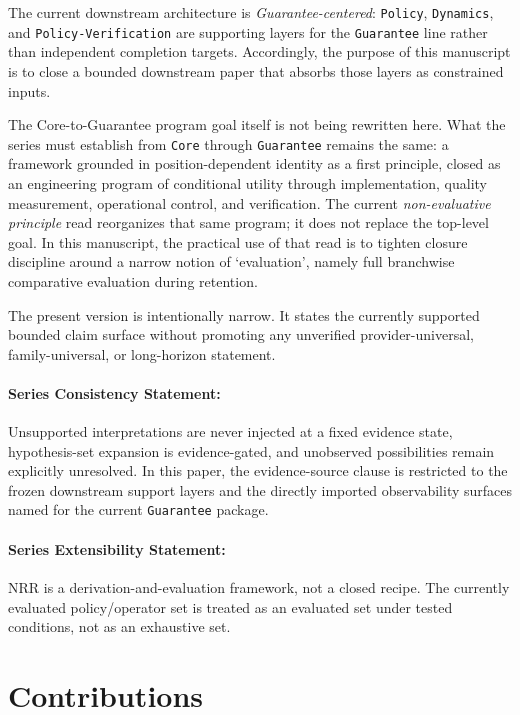 \documentclass[11pt]{article}
\begin{document}
The current downstream architecture is \textit{Guarantee-centered}: \texttt{Policy},
\texttt{Dynamics}, and \texttt{Policy-Verification} are supporting layers for the
\texttt{Guarantee} line rather than independent completion targets. Accordingly, the
purpose of this manuscript is to close a bounded downstream paper that absorbs those
layers as constrained inputs.

The Core-to-Guarantee program goal itself is not being rewritten here. What the
series must establish from \texttt{Core} through \texttt{Guarantee} remains the
same: a framework grounded in position-dependent identity as a first principle,
closed as an engineering program of conditional utility through
implementation, quality measurement, operational control, and verification. The
current \textit{non-evaluative principle} read reorganizes that same program; it
does not replace the top-level goal. In this manuscript, the practical use of
that read is to tighten closure discipline around a narrow notion of
`evaluation', namely full branchwise comparative evaluation during retention.

The present version is intentionally narrow. It states the currently supported
bounded claim surface without promoting any unverified provider-universal,
family-universal, or long-horizon statement.

\paragraph{Series Consistency Statement:}
Unsupported interpretations are never injected at a fixed evidence state,
hypothesis-set expansion is evidence-gated, and unobserved possibilities remain
explicitly unresolved. In this paper, the evidence-source clause is restricted to
the frozen downstream support layers and the directly imported observability
surfaces named for the current \texttt{Guarantee} package.

\paragraph{Series Extensibility Statement:}
NRR is a derivation-and-evaluation framework, not a closed recipe. The currently
evaluated policy/operator set is treated as an evaluated set under tested
conditions, not as an exhaustive set.

\section{Contributions}
\end{document}
